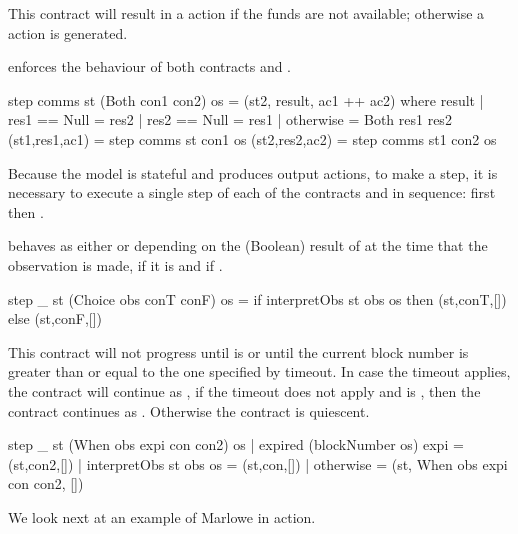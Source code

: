 \documentclass[runningheads]{llncs}
\begin{document}
This contract will result in a  action if the funds are not available; otherwise a 
 action is generated.

\medskip
\noindent
{} enforces the behaviour of both contracts  and . 
\begin{haskellcode}
step comms st (Both con1 con2) os =
    (st2, result, ac1 ++ ac2)
    where
        result | res1 == Null = res2
               | res2 == Null = res1
               | otherwise = Both res1 res2
        (st1,res1,ac1) = step comms st con1 os
        (st2,res2,ac2) = step comms st1 con2 os
\end{haskellcode}
Because the model is stateful and produces output actions, to make a step, it is necessary to execute a single step of 
each of  the contracts  and  in sequence: first  then 
.

\medskip
\noindent
{} behaves as either  or  depending on the 
(Boolean) result of  at the time that the observation is made,  if it is 
 and  if .

\begin{haskellcode}
step _ st (Choice obs conT conF) os =
    if interpretObs st obs os
        then (st,conT,[])
        else (st,conF,[])
\end{haskellcode}

\medskip
\noindent
{} This contract will not progress until  is 
 or until the current block number is greater than or equal to the one specified by timeout. In case 
the timeout applies, the contract will continue as , if the timeout does not apply and 
 is , then the contract continues as . Otherwise the contract is 
quiescent.

\begin{haskellcode}
step _ st (When obs expi con con2) os
  | expired (blockNumber os) expi = (st,con2,[])
  | interpretObs st obs os = (st,con,[])
  | otherwise = (st, When obs expi con con2, [])
  \end{haskellcode}
We look next at an example of Marlowe in action.
\end{document}
